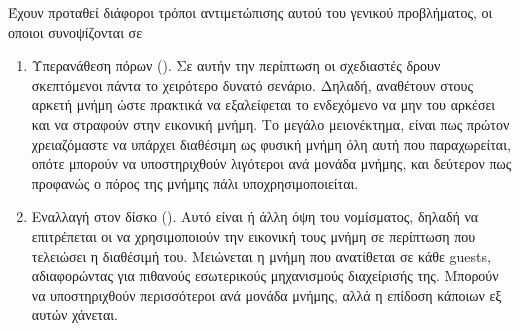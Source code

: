 Έχουν προταθεί διάφοροι τρόποι αντιμετώπισης αυτού του γενικού προβλήματος, οι οποιοι συνοψίζονται σε
\begin{enumerate}
  \item Υπερανάθεση πόρων (). Σε αυτήν την περίπτωση
  οι σχεδιαστές δρουν σκεπτόμενοι πάντα το χειρότερο δυνατό σενάριο. Δηλαδή,
  αναθέτουν στους  αρκετή μνήμη ώστε πρακτικά να εξαλείφεται
  το ενδεχόμενο να μην του αρκέσει και να στραφούν στην εικονική
  μνήμη. Το μεγάλο μειονέκτημα, είναι πως πρώτον χρειαζόμαστε να
  υπάρχει διαθέσιμη ως φυσική μνήμη όλη αυτή που παραχωρείται,
  οπότε μπορούν να υποστηριχθούν λιγότεροι  ανά μονάδα
  μνήμης, και δεύτερον πως προφανώς ο πόρος της μνήμης πάλι υποχρησιμοποιείται.

  \item Εναλλαγή στον δίσκο (). Αυτό είναι ή άλλη όψη του
  νομίσματος, δηλαδή να επιτρέπεται οι  να χρησιμοποιούν την
  εικονική τους μνήμη σε περίπτωση που τελειώσει η διαθέσιμή του. Μειώνεται η μνήμη που
  ανατίθεται σε κάθε guests, αδιαφορώντας για πιθανούς εσωτερικούς μηχανισμούς διαχείρισής της.
  Μπορούν να υποστηριχθούν περισσότεροι  ανά μονάδα μνήμης,
  αλλά η επίδοση κάποιων εξ αυτών χάνεται.


\end{enumerate}
